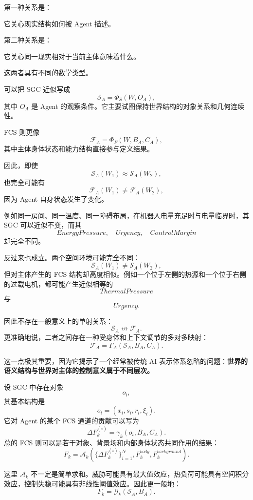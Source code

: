 第一种关系是：
\begin{statementbox}
\centering
{}
\end{statementbox}
它关心现实结构如何被 Agent 描述。

第二种关系是：
\begin{statementbox}
\centering
{}
\end{statementbox}
它关心同一现实相对于当前主体意味着什么。

这两者具有不同的数学类型。

可以把 SGC 近似写成
\[
\mathcal S_A
=
\Phi_S(W,O_A),
\]
其中 $O_A$ 是 Agent 的观察条件。它主要试图保持世界结构的对象关系和几何连续性。

FCS 则更像
\[
\mathcal F_A
=
\Phi_F(W,B_A,C_A),
\]
其中主体身体状态和能力结构直接参与定义结果。

因此，即使
\[
\mathcal S_A(W_1)
\approx
\mathcal S_A(W_2),
\]
也完全可能有
\[
\mathcal F_A(W_1)
\neq
\mathcal F_A(W_2),
\]
因为 Agent 自身状态发生了变化。

例如同一房间、同一温度、同一障碍布局，在机器人电量充足时与电量临界时，其 SGC 可以近似不变，而其
\[
EnergyPressure,\quad Urgency,\quad ControlMargin
\]
却完全不同。

反过来也成立。两个空间环境可能完全不同：
\[
\mathcal S_A(W_1)
\neq
\mathcal S_A(W_2),
\]
但对主体产生的 FCS 结构却高度相似。例如一个位于左侧的热源和一个位于右侧的过载电机，都可能产生近似相等的
\[
ThermalPressure
\]
与
\[
Urgency.
\]

因此不存在一般意义上的单射关系：
\[
\mathcal S_A
\not\leftrightarrow
\mathcal F_A.
\]
更准确地说，二者之间存在一种受身体和上下文调节的多对多映射：
\[
\mathcal F_A
=
\Gamma_A
\left(
\mathcal S_A,
B_A,
C_A
\right).
\]

这一点极其重要，因为它揭示了一个经常被传统 AI 表示体系忽略的问题：\textbf{世界的语义结构与世界对主体的控制意义属于不同层次。}

设 SGC 中存在对象
\[
o_i,
\]
其基本结构是
\[
o_i=(x_i,s_i,r_i,\xi_i).
\]
它对 Agent 的某个 FCS 通道的贡献可以写为
\[
\Delta F_k^{(i)}
=
\gamma_k
\left(
o_i,
B_A,
C_A
\right).
\]
总的 FCS 则可以是若干对象、背景场和内部身体状态共同作用的结果：
\[
F_k
=
\mathcal A_k
\left(
\{\Delta F_k^{(i)}\}_{i=1}^{N},
F_k^{body},
F_k^{background}
\right).
\]

这里 $\mathcal A_k$ 不一定是简单求和。威胁可能具有最大值效应，热负荷可能具有空间积分效应，控制失稳可能具有非线性阈值效应。因此更一般地：
\[
F_k
=
\mathcal G_k
\left(
\mathcal S_A,
B_A
\right).
\]


